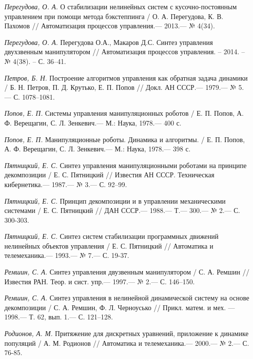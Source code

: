 \begin{thebibliography}{10}
	{\it Перегудова, О. А.} О стабилизации нелинейных систем с кусочно-постоянным управлением при помощи метода бэкстеппинга / О. А. Перегудова, К. В. Пахомов // Автоматизация процессов управления.—  2013.— № 4(34).
	
	{\it Перегудова, О. А.} Перегудова О.А., Макаров Д.С.  Синтез управления двухзвенным манипулятором // Автоматизация процессов управления. – 2014. – № 4(38). – С. 36–41.
	
	{\it Петров, Б. Н.} Построение алгоритмов управления как обратная задача динамики / Б. Н. Петров, П. Д. Крутько, Е. П. Попов // Докл. АН СССР.— 1979.— № 5.— С. 1078–1081.
	
	{\it Попов, Е. П.} Системы управления манипуляционных роботов / Е. П. Попов, А. Ф. Верещагин,
	С. Л. Зенкевич.— М.: Наука, 1978.— 400 с.
	
	{\it Попов, Е. П.} Манипуляционные роботы. Динамика и алгоритмы. / Е. П. Попов, А. Ф. Верещагин,
	С. Л. Зенкевич.— М.: Наука, 1978.— 398 с.
	
	{\it Пятницкий, Е. С.} Синтез управления манипуляционными роботами на принципе декомпозиции
	/ Е. С. Пятницкий // Известия АН СССР. Техническая кибернетика.—
	1987.— № 3.— С. 92–99.
	
	{\it Пятницкий, Е. С.} Принцип декомпозиции и в управлении механическими системами
	/ Е. С. Пятницкий // ДАН СССР.— 1988.— Т.— 300.— № 2.— С. 300-303.
	
	{\it Пятницкий, Е. С.} Синтез систем стабилизации программных движений нелинейных объектов управления
	/ Е. С. Пятницкий // Автоматика и телемеханика.— 1993.— № 7.— С. 19-37.
	
	{\it Ремшин, С. А.} Синтез управления двузвенным манипулятором /
	С. А. Ремшин // Известия РАН. Теор. и сист. упр.— 1997.— № 2.— С. 146–150.
	
	{\it Ремшин, С. А.} Синтез управления в нелинейной динамической систему на основе декомпозиции /
	С. А. Ремшин, Ф. Л. Черноусько // Прикл. матем. и мех. — 1998.— Т. 62, вып. 1.— С. 121–128.
	
	
	{\it Родионов, А. М.} Притяжение для дискретных уравнений, приложение к динамике популяций
	/ А. М. Родионов // Автоматика и телемеханика.— 2000.— № 2.— С. 76-85.
	

\end{thebibliography}
